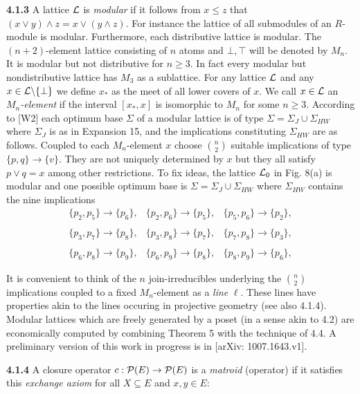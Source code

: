 \documentclass[11pt]{article}
\newcommand{\ra}{\rightarrow}
\begin{document}
{\bf 4.1.3} A lattice ${\cal L}$ is {\it modular} if it follows from $x \leq z$ that $(x \vee y) \wedge z = x \vee (y \wedge z)$. For instance the lattice of all submodules of an $R$-module is modular. Furthermore, each distributive lattice is modular. 
The $(n+2)$-element lattice consisting of $n$ atoms and $\bot, \top$ will be denoted by $M_n$.  It is modular but not distributive for $n \geq 3$. In fact every modular but nondistributive lattice has $M_3$ as a sublattice. For any lattice ${\cal L}$ and any $x \in {\cal L}\backslash \{\bot\}$ we define $x_\ast$ as the meet of all lower covers of $x$.  We call $x \in {\cal L}$ an $M_n${\it -element} if the interval $[x_\ast, x]$ is isomorphic to $M_n$ for some $n \geq 3$.  According to [W2] each optimum base $\Sigma$ of a modular lattice is of type $\Sigma = \Sigma_J \cup \Sigma_{HW}$ where $\Sigma_J$ is as in Expansion 15, and the implications constituting  $\Sigma_{HW}$ are as follows. Coupled to each $M_n$-element $x$ choose ${n \choose 2}$ suitable implications of type $\{p,q\} \ra \{v\}$. They are not uniquely determined by $x$ but they all satisfy $p \vee q = x$ among other restrictions. To fix ideas, the lattice ${\cal L}_0$ in Fig. 8(a) is modular and one possible optimum base is $\Sigma = \Sigma_J \cup \Sigma_{HW}$ where $\Sigma_{HW}$ contains the nine implications
$$\begin{array}{lll}
\{p_2, p_5\} \ra \{p_6\}, & \{p_2, p_6\} \ra \{p_5 \}, & \{p_5, p_6\} \ra \{p_2\},\\
\\
\{p_3, p_7\} \ra \{p_8\}, & \{p_3, p_8\} \ra \{p_7 \}, & \{p_7, p_8\} \ra \{p_3\},\\
\\
\{p_6, p_8\} \ra \{p_9\}, & \{p_6, p_9\} \ra \{p_8 \}, & \{p_8, p_9\} \ra \{p_6\},\end{array}$$

It is convenient to think of the $n$ join-irreducibles underlying the ${n \choose 2}$ implications coupled to a fixed $M_n$-element as a {\it line} $\ell$. These lines have properties akin to the lines occuring in projective geometry (see also 4.1.4). Modular lattices which are freely generated by a poset (in a sense akin to 4.2) are economically computed by combining Theorem 5 with the technique of 4.4. A preliminary version of this work in progress is in [arXiv: 1007.1643.v1].


{\bf 4.1.4} A closure operator $c: {\cal P}(E) \ra {\cal P}(E)$ is a {\it matroid} (operator) if it satisfies this {\it exchange axiom} for all $X \subseteq E$ and $x,y \in E$:
\end{document}
